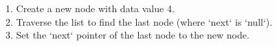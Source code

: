 \documentclass[preview]{standalone}
\begin{document}
1. Create a new node with data value 4.\\2. Traverse the list to find the last node (where `next` is `null`).\\3. Set the `next` pointer of the last node to the new node.\\
\end{document}
